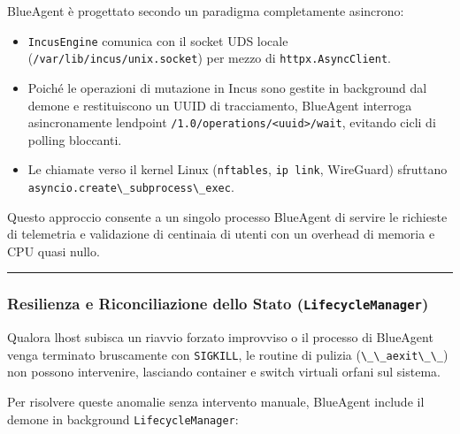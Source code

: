 BlueAgent è progettato secondo un paradigma completamente asincrono:

\begin{itemize}
\tightlist
\item
  \passthrough{\lstinline!IncusEngine!} comunica con il socket UDS
  locale (\passthrough{\lstinline!/var/lib/incus/unix.socket!}) per
  mezzo di \passthrough{\lstinline!httpx.AsyncClient!}.
\item
  Poiché le operazioni di mutazione in Incus sono gestite in background
  dal demone e restituiscono un UUID di tracciamento, BlueAgent
  interroga asincronamente l\textquotesingle endpoint
  \passthrough{\lstinline!/1.0/operations/<uuid>/wait!}, evitando cicli
  di polling bloccanti.
\item
  Le chiamate verso il kernel Linux (\passthrough{\lstinline!nftables!},
  \passthrough{\lstinline!ip link!}, WireGuard) sfruttano
  \passthrough{\lstinline!asyncio.create\_subprocess\_exec!}.
\end{itemize}

Questo approccio consente a un singolo processo BlueAgent di servire le
richieste di telemetria e validazione di centinaia di utenti con un
overhead di memoria e CPU quasi nullo.

\begin{center}\rule{0.5\linewidth}{0.5pt}\end{center}

\subsubsection{\texorpdfstring{Resilienza e Riconciliazione dello Stato
(\texttt{LifecycleManager})}{Resilienza e Riconciliazione dello Stato (LifecycleManager)}}\label{resilienza-e-riconciliazione-dello-stato-lifecyclemanager}

Qualora l\textquotesingle host subisca un riavvio forzato improvviso o
il processo di BlueAgent venga terminato bruscamente con
\passthrough{\lstinline!SIGKILL!}, le routine di pulizia
(\passthrough{\lstinline!\_\_aexit\_\_!}) non possono intervenire,
lasciando container e switch virtuali orfani sul sistema.

Per risolvere queste anomalie senza intervento manuale, BlueAgent
include il demone in background
\passthrough{\lstinline!LifecycleManager!}:

